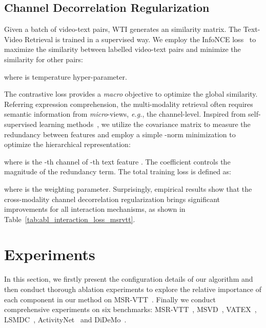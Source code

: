 \documentclass[runningheads]{llncs}
\begin{document}
\subsection{Channel Decorrelation Regularization}
Given a batch of  video-text pairs, WTI generates an  similarity matrix.
The Text-Video Retrieval is trained in a supervised way. 
We employ the InfoNCE loss~\cite{infonce} to maximize the similarity between labelled video-text pairs and minimize the similarity for other pairs:

where  is temperature hyper-parameter.

The contrastive loss provides a \textit{macro} objective to optimize the global similarity.
Referring expression comprehension, the multi-modality retrieval often requires semantic information from \textit{micro}-views, \textit{e.g.}, the channel-level.
Inspired from self-supervised learning methods~\cite{barlow}, we utilize the covariance matrix to measure the redundancy between features and employ a simple -norm minimization to optimize the hierarchical representation:

where  is the -th channel of -th text feature . The coefficient  controls the magnitude of the redundancy term.
The total training loss   is  defined as: 

where  is the weighting parameter.
Surprisingly, empirical results show that the cross-modality channel decorrelation regularization brings significant improvements for all interaction mechanisms, as shown in Table~\ref{tab:abl_interaction_loss_msrvtt}. 
\section{Experiments}
\label{sec:experiments}
In this section, we firstly present the configuration details of our algorithm and then conduct thorough ablation experiments to explore the relative importance of each component in our method on MSR-VTT~\cite{msrvtt}.
Finally we conduct comprehensive experiments on six benchmarks: MSR-VTT~\cite{msrvtt}, MSVD~\cite{msvd}, VATEX~\cite{vatex},  LSMDC~\cite{lsmdc}, ActivityNet~\cite{anet} and DiDeMo~\cite{didemo}.  
\end{document}
